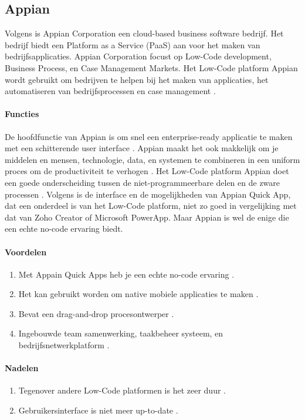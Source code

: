 \subsection{Appian}%
\label{subsec:appian}
Volgens \textcite{Shala} is Appian Corporation een cloud-based business software bedrijf. Het bedrijf biedt een Platform as a Service (PaaS) aan voor het maken van bedrijfsapplicaties.
Appian Corporation focust op Low-Code development, Business Process, en Case Management Markets. Het Low-Code platform Appian wordt gebruikt om bedrijven te helpen
bij het maken van applicaties, het automatiseren van bedrijfsprocessen en case management \autocite{Shala}.
\paragraph{Functies}
De hoofdfunctie van Appian is om snel een enterprise-ready applicatie te maken met een schitterende user interface \autocite{Shala}. Appian maakt het ook makkelijk 
om je middelen en mensen, technologie, data, en systemen te combineren in een uniform proces om de productiviteit te verhogen \autocite{Shala}.
Het Low-Code platform Appian doet een goede onderscheiding tussen de niet-programmeerbare delen en de zware processen \autocite{Marvin2017}.
Volgens \textcite{Marvin2017} is de interface en de mogelijkheden van Appian Quick App, dat een onderdeel is van het Low-Code platform, niet zo goed in vergelijking met dat van Zoho Creator of Microsoft PowerApp. Maar Appian is wel de enige die een echte no-code ervaring biedt.

\paragraph*{Voordelen}
\begin{enumerate}
    \item Met Appain Quick Apps heb je een echte no-code ervaring \autocite{Marvin2017}.
    \item Het kan gebruikt worden om native mobiele applicaties te maken \autocite{Marvin2017}.
    \item Bevat een drag-and-drop procesontwerper \autocite{Marvin2017}.
    \item Ingebouwde team samenwerking, taakbeheer systeem, en bedrijfsnetwerkplatform \autocite{Marvin2017}.
\end{enumerate}


\paragraph*{Nadelen}
\begin{enumerate}
    \item Tegenover andere Low-Code platformen is het zeer duur \autocite{Marvin2017}.
    \item Gebruikersinterface is niet meer up-to-date \autocite{Marvin2017}.
\end{enumerate}


